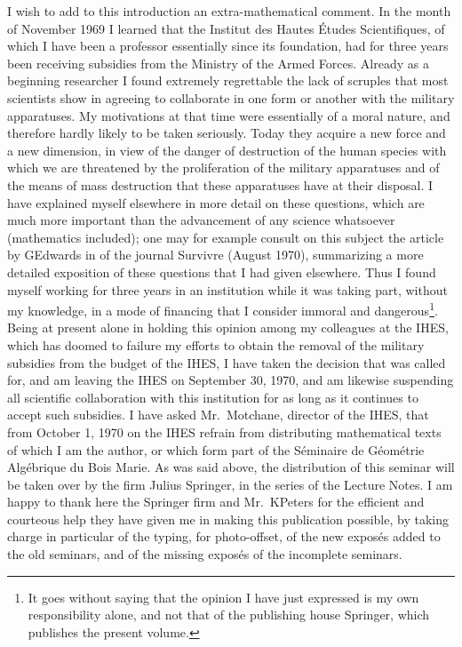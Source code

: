I wish to add to this introduction an extra-mathematical comment. In the
month of November 1969 I learned that the Institut des Hautes \'Etudes
Scientifiques, of which I have been a professor essentially since its
foundation, had for three years been receiving subsidies from the
Ministry of the Armed Forces. Already as a beginning researcher I found
extremely regrettable the lack of scruples that most scientists show in
agreeing to collaborate in one form or another with the military
apparatuses. My motivations at that time were essentially of a moral
nature, and therefore hardly likely to be taken seriously. Today they
acquire a new force and a new dimension, in view of the danger of
destruction of the human species with which we are threatened by the
proliferation of the military apparatuses and of the means of mass
destruction that these apparatuses have at their disposal. I have
explained myself elsewhere in more detail on these questions, which are
much more important than the advancement of any science whatsoever
(mathematics included); one may for example consult on this subject the
article by G\ptbl Edwards in  of the journal Survivre (August 1970),
summarizing a more detailed exposition of these questions that I had
given elsewhere. Thus I found myself working for three years in an
institution while it was taking part, without my knowledge, in a mode of
financing that I consider immoral and dangerous\footnote{It goes without
saying that the opinion I have just expressed is my own
responsibility alone, and not that of the publishing house Springer,
which publishes the present volume.}. Being at present alone in holding this
opinion among my colleagues at the IHES, which has doomed to failure my
efforts to obtain the removal of the military subsidies from the budget
of the IHES, I have taken the decision that was called for, and am
leaving the IHES on September 30, 1970, and am likewise suspending all
scientific collaboration with this institution for as long as it
continues to accept such subsidies. I have asked Mr.~Motchane, director
of the IHES, that from October 1, 1970 on the IHES refrain from
distributing mathematical texts of which I am the author, or which form
part of the S\'eminaire de G\'eom\'etrie Alg\'ebrique du Bois Marie. As
was said above, the distribution of this seminar will be taken over by
the firm Julius Springer, in the series of the Lecture Notes. I am happy
to thank here the Springer firm and Mr.~K\ptbl Peters for the efficient
and courteous help they have given me in making this publication
possible, by taking charge in particular of the typing, for photo-offset,
of the new expos\'es added to the old seminars, and of the missing expos\'es
of the incomplete seminars.

